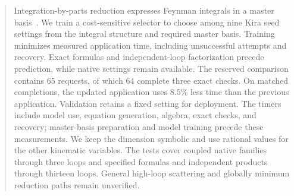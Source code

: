 \begin{abstract}
Integration-by-parts reduction expresses Feynman integrals in a master basis~\cite{KiraOriginal}. We train a cost-sensitive selector to choose among nine Kira seed settings from the integral structure and required master basis. Training minimizes measured application time, including unsuccessful attempts and recovery. Exact formulas and independent-loop factorization precede prediction, while native settings remain available. The reserved comparison contains 65 requests, of which 64 complete three exact checks. On matched completions, the updated application uses 8.5\% less time than the previous application. Validation retains a fixed setting for deployment. The timers include model use, equation generation, algebra, exact checks, and recovery; master-basis preparation and model training precede these measurements. We keep the dimension symbolic and use rational values for the other kinematic variables. The tests cover coupled native families through three loops and specified formulas and independent products through thirteen loops. General high-loop scattering and globally minimum reduction paths remain unverified.
\end{abstract}
